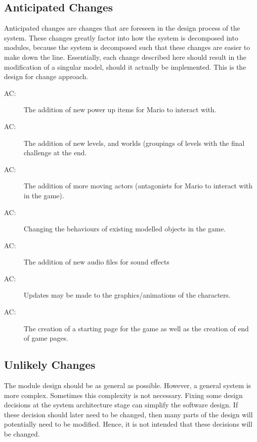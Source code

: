 \documentclass[12pt, titlepage]{article}
\newcounter{acnum}
\newcommand{\actheacnum}{AC\theacnum}
\begin{document}
\subsection{Anticipated Changes} \label{SecAchange}

Anticipated changes are changes that are foreseen in the design process of the system. These changes greatly factor into how the system is decomposed into modules, because the system is decomposed such that these changes are easier to make down the line. Essentially, each change described here should result in the modification of a singular model, should it actually be implemented. This is the design for change approach.


\begin{description}
\item[ \actheacnum \label{ac1}:] The addition of new power up items for Mario to interact with.
\item[ \actheacnum \label{ac2}:] The addition of new levels, and worlds (groupings of levels with the final challenge at the end.
\item[ \actheacnum \label{ac3}:] The addition of more moving actors (antagonists for Mario to interact with in the game).
\item[ \actheacnum \label{ac4}:] Changing the behaviours of existing modelled objects in the game.
\item[ \actheacnum \label{ac5}:] The addition of new audio files for sound effects
\item[ \actheacnum \label{ac6}:] Updates may be made to the graphics/animations of the characters.
\item[ \actheacnum \label{ac7}:] The creation of a starting page for the game as well as the creation of end of game pages.

\end{description}

\subsection{Unlikely Changes} \label{SecUchange}

The module design should be as general as possible. However, a general system is
more complex. Sometimes this complexity is not necessary. Fixing some design
decisions at the system architecture stage can simplify the software design. If
these decision should later need to be changed, then many parts of the design
will potentially need to be modified. Hence, it is not intended that these
decisions will be changed.
\end{document}
